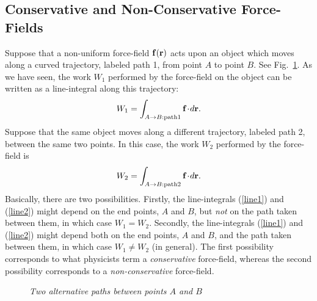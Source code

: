 \subsection{Conservative and Non-Conservative Force-Fields}
Suppose that a non-uniform force-field ${\bf f}({\bf r})$  acts upon
an object which moves along a curved trajectory, labeled path 1,  from point $A$ to
point $B$. See Fig.~\ref{f40}. As we have seen, the work $W_1$ performed by the force-field
on the object can be written as a line-integral along this trajectory:
\begin{equation}\label{line1}
W_1 = \int_{A\rightarrow B: {\rm path} 1} {\bf f}\!\cdot\!d{\bf r}.
\end{equation}
Suppose that the same object moves along a different trajectory, labeled path
2, between the same two points. In this case, the work $W_2$ performed by the force-field is
\begin{equation}\label{line2}
W_2 = \int_{A\rightarrow B:{\rm path} 2} {\bf f}\!\cdot\!d{\bf r}.
\end{equation}
Basically, there are  two possibilities. Firstly, the line-integrals (\ref{line1}) and
(\ref{line2}) might depend on the end points, $A$ and $B$, but {\em not} on the path
taken between them, in which case $W_1=W_2$. Secondly, the line-integrals (\ref{line1}) and
(\ref{line2}) might depend both on the end points, $A$ and $B$, and the path
taken between them, in which case $W_1\neq W_2$ (in general). The first possibility
corresponds to what physicists term a {\em conservative} force-field, whereas the
second possibility corresponds to a {\em non-conservative}  force-field.

\begin{figure}
\epsfysize=2.5in
\centerline{}
\caption{\em Two alternative paths between points $A$ and  $B$}\label{f40}   
\end{figure}

